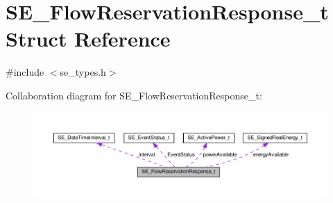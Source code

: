 \hypertarget{structSE__FlowReservationResponse__t}{}\section{S\+E\+\_\+\+Flow\+Reservation\+Response\+\_\+t Struct Reference}
\label{structSE__FlowReservationResponse__t}


{\ttfamily \#include $<$se\+\_\+types.\+h$>$}



Collaboration diagram for S\+E\+\_\+\+Flow\+Reservation\+Response\+\_\+t\+:\nopagebreak
\begin{figure}[H]
\begin{center}
\leavevmode
\includegraphics[width=350pt]{structSE__FlowReservationResponse__t__coll__graph}
\end{center}
\end{figure}
